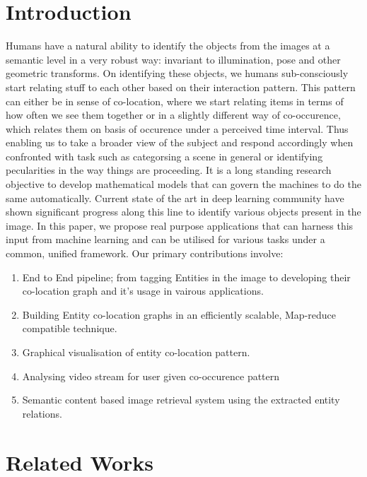 \documentclass[conference]{IEEEtran}
\begin{document}
\section{Introduction}
Humans have a natural ability to identify the objects from the images at a semantic level in a very robust way: invariant to illumination, pose and other geometric transforms. On identifying these objects, we humans sub-consciously start relating stuff to each other based on their interaction pattern. This pattern can either be in sense of co-location, where we start relating items in terms of how often we see them together or in a slightly different way of co-occurence, which relates them on basis of occurence under a perceived time interval. Thus enabling us to take a broader view of the subject and respond accordingly when confronted with task such as categorsing a scene in general or identifying pecularities in the way things are proceeding. It is  a long standing research objective to develop mathematical models that can govern the machines to do the same automatically. Current state of the art in deep learning community have shown significant progress along this line to identify various objects present in the image. In this paper, we propose real purpose applications that can harness this input from machine learning and can be utilised for various tasks under a common, unified framework. Our primary contributions involve:
    \begin{enumerate}
        \item End to End pipeline; from tagging Entities in the image to developing their co-location graph and it's usage in vairous applications.
        \item Building Entity co-location graphs in an efficiently scalable, Map-reduce compatible technique.
        \item Graphical visualisation of entity co-location pattern.
        \item Analysing video stream for user given co-occurence pattern
        \item Semantic content based image retrieval system using the extracted entity relations.
    \end{enumerate}


\section{Related Works}
\end{document}
